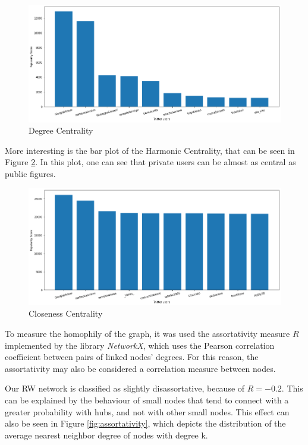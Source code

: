 \documentclass[sigchi]{acmart}
\begin{document}
\begin{figure}[h]
    \centering
    \includegraphics[width=0.8\columnwidth]{report/img/Degree_centrality.png}
    \caption{Degree Centrality}
    \label{fig:degree_centrality}
\end{figure}

More interesting is the bar plot of the Harmonic Centrality, that can be seen in Figure \ref{fig:closeness_centrality}. In this plot, one can see that private users can be almost as central as public figures. 

\begin{figure}[h]
    \centering
    \includegraphics[width=0.8\columnwidth]{report/img/Harmonic_centrality.png}
    \caption{Closeness Centrality}
    \label{fig:closeness_centrality}
\end{figure}

To measure the homophily of the graph, it was used the assortativity measure $R$ implemented by the library \textit{NetworkX}, which uses the Pearson correlation coefficient between pairs of linked nodes' degrees. For this reason, the assortativity may also be considered a correlation measure between nodes. 

Our RW network is classified as slightly disassortative, because of $R=-0.2$. This can be explained by the behaviour of small nodes that tend to connect with a greater probability with hubs, and not with other small nodes. This effect can also be seen in Figure \ref{fig:assortativity}, which depicts the distribution of the average nearest neighbor degree of nodes with degree k.
\end{document}
